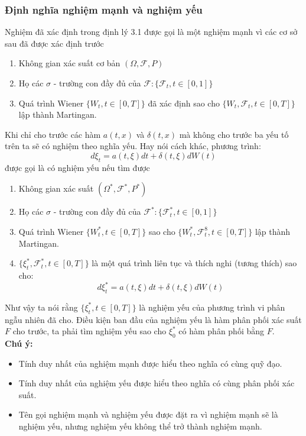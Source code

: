 \documentclass[a4paper]{article}
\numberwithin{equation}{section}
\begin{document}
\subsubsection{Định nghĩa nghiệm mạnh và nghiệm yếu}
Nghiệm đã xác định trong định lý 3.1 được gọi là một nghiệm mạnh vì các cơ sở sau đã được xác định trước
\begin{enumerate}[1)]
	\item Không gian xác suất cơ bản $(\Omega,\mathscr{F},P)$
	\item Họ các $\sigma$ - trường con đầy đủ của $\mathscr{F}:\{\mathscr{F}_t,t\in[0,1]\}$
	\item Quá trình Wiener $\{W_t,t\in[0,T]\}$ đã xác định sao cho $\{W_t,\mathscr{F}_t,t\in[0,T]\}$ lập thành Martingan.
\end{enumerate}
Khi chỉ cho trước các hàm $a(t,x)$ và $\delta(t,x)$ mà không cho trước ba yếu tố trên ta sẽ có nghiệm theo nghĩa yếu. Hay nói cách khác, phương trình:
\begin{equation*}
	d\xi_t=a(t,\xi)dt+\delta(t,\xi)dW(t)
\end{equation*}
được gọi là có nghiệm yếu nếu tìm được
\begin{enumerate}[(1*)]
	\item Không gian xác suất $(\Omega^*,\mathscr{F}^*,P^*)$
	\item Họ các $\sigma$ - trường con đầy đủ của $\mathscr{F}^*:\{\mathscr{F}^*_t,t\in[0,1]\}$
	\item Quá trình Wiener $\{W_t^*,t\in[0,T]\}$ sao cho $\{W_t^*,\mathscr{F}^8_t,t\in[0,T]\}$ lập thành Martingan.
	\item $\{\xi_t^*,\mathscr{F}_t^*,t\in[0,T]\}$ là một quá trình liên tục và thích nghi (tương thích) sao cho:
	\begin{equation*}
		d\xi_t^*=a(t,\xi)dt+\delta(t,\xi)dW(t)	
	\end{equation*}
\end{enumerate}
Như vậy ta nói rằng $\{\xi_t^*,t\in[0,T]\}$ là nghiệm yếu của phương trình vi phân ngẫu nhiên đã cho. Điều kiện ban đầu của nghiệm yếu là hàm phân phối xác suất $F$ cho trước, ta phải tìm nghiệm yếu sao cho $\xi_0^*$ có hàm phân phối bằng $F$.\\
\textbf{Chú ý:}
\begin{itemize}[*]
	\item Tính duy nhất của nghiệm mạnh được hiểu theo nghĩa có cùng quỹ đạo.
	\item Tính duy nhất của nghiệm yếu được hiểu theo nghĩa có cùng phân phối xác suất.
	\item Tên gọi nghiệm mạnh và nghiệm yếu được đặt ra vì nghiệm mạnh sẽ là nghiệm yếu, nhưng nghiệm yếu không thể trở thành nghiệm mạnh.
\end{itemize}
\pagebreak
\end{document}
